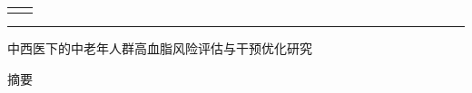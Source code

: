 \documentclass[12pt]{article}
\begin{document}
	
	
	\begin{table}[h]
		\centering
		\renewcommand{\arraystretch}{1.5} %
		\begin{tabular}{|c|c|}
			\hline
			\makebox[0.25\textwidth][c]{队伍编号} & \makebox[0.25\textwidth][c]{MC2608331} \\
			\hline
			\makebox[0.25\textwidth][c]{题号} & \makebox[0.25\textwidth][c]{C} \\
			\hline
		\end{tabular}
	\end{table}
	
	\noindent\rule{\textwidth}{1pt}
	
	\begin{center}
		\songti{} 中西医下的中老年人群高血脂风险评估与干预优化研究
	\end{center}
	
	\begin{center}
		\songti{} 摘要
	\end{center}
	
\end{document}
